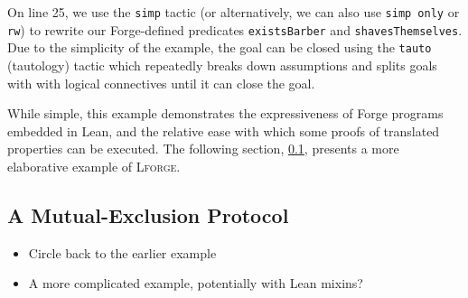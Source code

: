 On line 25, we use the \texttt{simp} tactic (or alternatively, we can also use \texttt{simp only} or \texttt{rw}) to rewrite our Forge-defined predicates \texttt{existsBarber} and \texttt{shavesThemselves}. Due to the simplicity of the example, the goal can be closed using the \texttt{tauto} (tautology) tactic which repeatedly breaks down assumptions and splits goals with with logical connectives until it can close the goal. 

While simple, this example demonstrates the expressiveness of Forge programs embedded in Lean, and the relative ease with which some proofs of translated properties can be executed. The following section, \cref{sec:mutex}, presents a more elaborative example of \textsc{Lforge}.

\subsection{A Mutual-Exclusion Protocol}\label{sec:mutex}

\begin{itemize}
  \item Circle back to the earlier example
  \item A more complicated example, potentially with Lean mixins?
\end{itemize}
